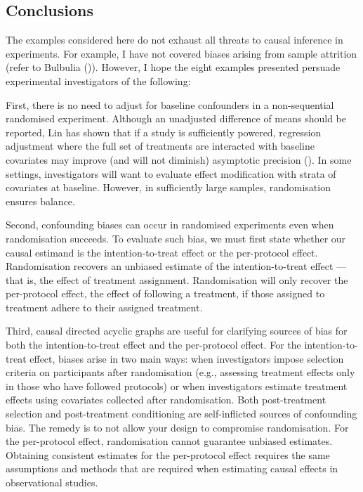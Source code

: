 \documentclass[
  single column]{article}
\begin{document}
\subsection{Conclusions}\label{conclusions}

The examples considered here do not exhaust all threats to causal
inference in experiments. For example, I have not covered biases arising
from sample attrition (refer to Bulbulia
()). However, I hope the eight
examples presented persuade experimental investigators of the following:

First, there is no need to adjust for baseline confounders in a
non-sequential randomised experiment. Although an unadjusted difference
of means should be reported, Lin has shown that if a study is
sufficiently powered, regression adjustment where the full set of
treatments are interacted with baseline covariates may improve (and will
not diminish) asymptotic precision
(). In some settings,
investigators will want to evaluate effect modification with strata of
covariates at baseline. However, in sufficiently large samples,
randomisation ensures balance.

Second, confounding biases can occur in randomised experiments even when
randomisation succeeds. To evaluate such bias, we must first state
whether our causal estimand is the intention-to-treat effect or the
per-protocol effect. Randomisation recovers an unbiased estimate of the
intention-to-treat effect --- that is, the effect of treatment
assignment. Randomisation will only recover the per-protocol effect, the
effect of following a treatment, if those assigned to treatment adhere
to their assigned treatment.

Third, causal directed acyclic graphs are useful for clarifying sources
of bias for both the intention-to-treat effect and the per-protocol
effect. For the intention-to-treat effect, biases arise in two main
ways: when investigators impose selection criteria on participants after
randomisation (e.g., assessing treatment effects only in those who have
followed protocols) or when investigators estimate treatment effects
using covariates collected after randomisation. Both post-treatment
selection and post-treatment conditioning are self-inflicted sources of
confounding bias. The remedy is to not allow your design to compromise
randomisation. For the per-protocol effect, randomisation cannot
guarantee unbiased estimates. Obtaining consistent estimates for the
per-protocol effect requires the same assumptions and methods that are
required when estimating causal effects in observational studies.
\end{document}
